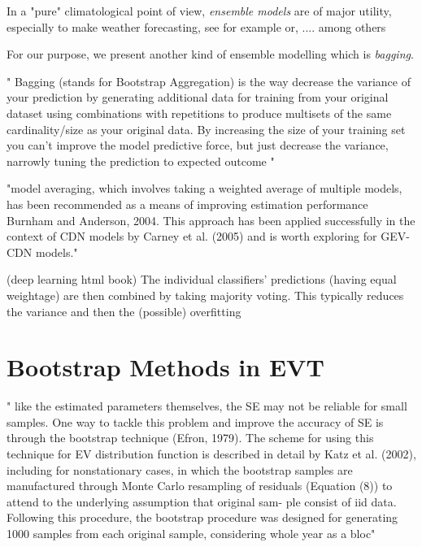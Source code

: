 \documentclass[11pt,a4paper,openany ]{book}
\begin{document}
In a "pure" climatological point of view, \emph{ensemble models} are of major utility, especially to make weather forecasting, see for example \citet{suh_development_2012} or, .... among others

For our purpose, we present another kind of ensemble modelling which is \emph{bagging}.

" Bagging (stands for Bootstrap Aggregation) is the way decrease the variance of your prediction by generating additional data for training from your original dataset using combinations with repetitions to produce multisets of the same cardinality/size as your original data. By increasing the size of your training set you can't improve the model predictive force, but just decrease the variance, narrowly tuning the prediction to expected outcome "


"model averaging, which involves taking a weighted average of
multiple models, has been recommended as a means of
improving estimation performance Burnham and Anderson, 2004. This approach has been applied successfully
in the context of CDN models by Carney et al. (2005)
and is worth exploring for GEV-CDN models."


\citet[pp.256-267]{Goodfellow-et-al-2016}  (deep learning html book)    The  individual  classifiers’  predictions  (having
equal  weightage)  are  then  combined  by  taking  majority voting. This typically reduces the variance and then the (possible) overfitting






\section{Bootstrap Methods in EVT}

" like
the estimated parameters themselves, the SE may not be
reliable for small samples. One way to tackle this problem and improve the accuracy of SE is through the bootstrap technique (Efron, 1979). The scheme for using this technique for EV distribution  function is described in detail by Katz et al. (2002), including for nonstationary cases,
in which the bootstrap samples are manufactured through
Monte  Carlo  resampling  of  residuals  (Equation (8))  to attend  to  the  underlying  assumption  that  original  sam-
ple  consist  of  iid  data.  Following  this procedure,  the bootstrap  procedure  was  designed  for  generating  1000
samples  from  each  original  sample,  considering  whole year  as  a  bloc"
\end{document}
